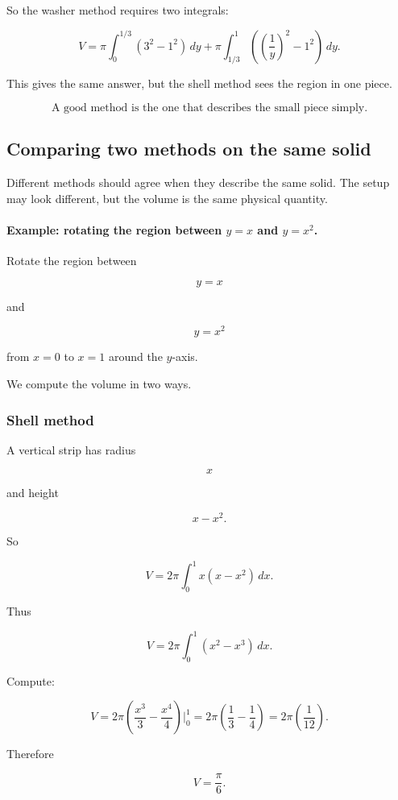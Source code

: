 So the washer method requires two integrals:

\[
V
=
\pi\int_0^{1/3}(3^2-1^2)\,dy
+
\pi\int_{1/3}^1\left(\left(\frac1y\right)^2-1^2\right)\,dy.
\]

This gives the same answer, but the shell method sees the region in one piece.

\[
\boxed{
\text{A good method is the one that describes the small piece simply.}
}
\]

\subsection{Comparing two methods on the same solid}
\label{subsec:comparing-shells-washers-same-solid}

Different methods should agree when they describe the same solid.  The setup may
look different, but the volume is the same physical quantity.

\paragraph{Example: rotating the region between \(y=x\) and \(y=x^2\).}
Rotate the region between

\[
y=x
\]

and

\[
y=x^2
\]

from \(x=0\) to \(x=1\) around the \(y\)-axis.

We compute the volume in two ways.

\subsubsection*{Shell method}

A vertical strip has radius

\[
x
\]

and height

\[
x-x^2.
\]

So

\[
V=2\pi\int_0^1 x(x-x^2)\,dx.
\]

Thus

\[
V=2\pi\int_0^1 (x^2-x^3)\,dx.
\]

Compute:

\[
V
=
2\pi\left(\frac{x^3}{3}-\frac{x^4}{4}\right)\Big|_0^1
=
2\pi\left(\frac13-\frac14\right)
=
2\pi\left(\frac1{12}\right).
\]

Therefore

\[
\boxed{
V=\frac{\pi}{6}.
}
\]

